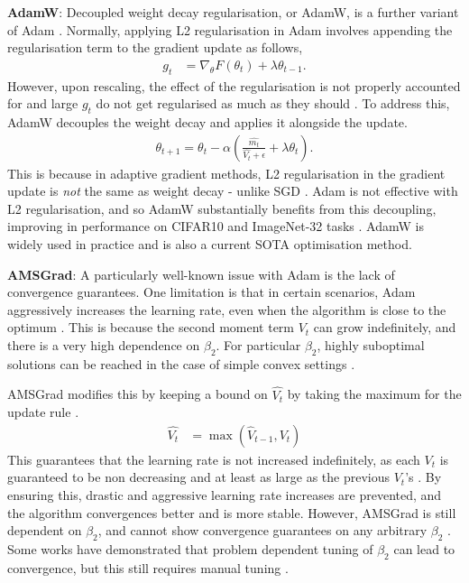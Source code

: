 \textbf{AdamW}: Decoupled weight decay regularisation, or AdamW, is a further variant of Adam \citep{loshchilov2017decoupled}. Normally, applying L2 regularisation in Adam involves appending the regularisation term to the gradient update as follows,
\begin{align}
    g_t &= \nabla_{\theta} F(\theta_t) + \lambda \theta_{t-1}.
\end{align}
However, upon rescaling, the effect of the regularisation is not properly accounted for and large $g_t$ do not get regularised as much as they should \citep{loshchilov2017decoupled}. To address this, AdamW decouples the weight decay and applies it alongside the update.
\begin{align}
    \theta_{t+1} = \theta_t - \alpha \left( \frac{\hat{m_t}}{\hat{V_t} + \epsilon} + \lambda \theta_t \right).
\end{align}
This is because in adaptive gradient methods, L2 regularisation in the gradient update is \textit{not} the same as weight decay - unlike SGD \citep{loshchilov2017decoupled}. Adam is not effective with L2 regularisation, and so AdamW substantially benefits from this decoupling, improving in performance on CIFAR10 and ImageNet-32 tasks \citep{loshchilov2017decoupled}. AdamW is widely used in practice and is also a current SOTA optimisation method.

\textbf{AMSGrad}: A particularly well-known issue with Adam is the lack of convergence guarantees. One limitation is that in certain scenarios, Adam aggressively increases the learning rate, even when the algorithm is close to the optimum \citep{reddi2019asmgrad}. This is because the second moment term $V_t$ can grow indefinitely, and there is a very high dependence on $\beta_2$. For particular $\beta_2$, highly suboptimal solutions can be reached in the case of simple convex settings \citep{reddi2019asmgrad}.

AMSGrad modifies this by keeping a bound on $\hat{V_t}$ by taking the maximum for the update rule \citep{reddi2019asmgrad}.
\begin{align}
    \hat{V_{t}} &= \max(\hat{V}_{t-1}, V_t)
\end{align}
This guarantees that the learning rate is not increased indefinitely, as each $V_t$ is guaranteed to be non decreasing and at least as large as the previous $V_t$'s \citep{reddi2019asmgrad}. By ensuring this, drastic and aggressive learning rate increases are prevented, and the algorithm convergences better and is more stable. However, AMSGrad is still dependent on $\beta_2$, and cannot show convergence guarantees on any arbitrary $\beta_2$ \citep{taniguchi2024adopt}. Some works have demonstrated that problem dependent tuning of $\beta_2$ can lead to convergence, but this still requires manual tuning \citep{taniguchi2024adopt}.

